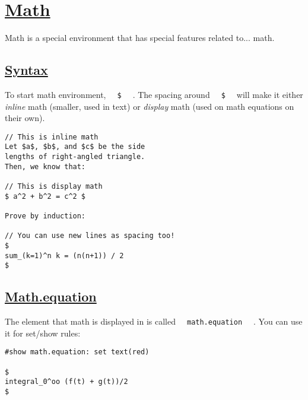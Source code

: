 \pandocbounded{}

\section{\texorpdfstring{\hyperref[math-1]{Math}}{Math}}\label{math-1}

Math is a special environment that has special features related to...
math.

\subsection{\texorpdfstring{\hyperref[syntax]{Syntax}}{Syntax}}\label{syntax}

To start math environment, \texttt{\ }{\texttt{\ \$\ }}\texttt{\ } . The
spacing around \texttt{\ }{\texttt{\ \$\ }}\texttt{\ } will make it
either \emph{inline} math (smaller, used in text) or \emph{display} math
(used on math equations on their own).

\begin{verbatim}
// This is inline math
Let $a$, $b$, and $c$ be the side
lengths of right-angled triangle.
Then, we know that:

// This is display math
$ a^2 + b^2 = c^2 $

Prove by induction:

// You can use new lines as spacing too!
$
sum_(k=1)^n k = (n(n+1)) / 2
$
\end{verbatim}

\pandocbounded{}

\subsection{\texorpdfstring{\hyperref[mathequation]{Math.equation}}{Math.equation}}\label{mathequation}

The element that math is displayed in is called
\texttt{\ }{\texttt{\ math.equation\ }}\texttt{\ } . You can use it for
set/show rules:

\begin{verbatim}
#show math.equation: set text(red)

$
integral_0^oo (f(t) + g(t))/2
$
\end{verbatim}

\pandocbounded{}

